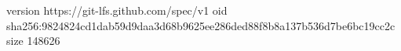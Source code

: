 version https://git-lfs.github.com/spec/v1
oid sha256:9824824cd1dab59d9daa3d68b9625ee286ded88f8b8a137b536d7be6bc19cc2c
size 148626
